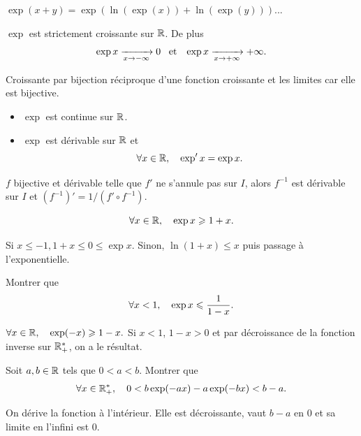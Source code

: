 \documentclass{magnoliaold}
\begin{document}
\begin{preuve}
$\exp(x+y)=\exp(\ln(\exp(x))+\ln(\exp(y)))$...
\end{preuve}

\begin{proposition}[utile=-3]
$\exp$ est strictement croissante sur $\mathbb{R}$. De plus
\[\exp x\xrightarrow[x\rightarrow -\infty]{} 0 \quad\!\text{et}\quad\! \exp x\xrightarrow[x\rightarrow +\infty]{} +\infty.\]
\end{proposition}

\begin{preuve}
Croissante par bijection réciproque d'une fonction croissante et les limites car elle est bijective.
\end{preuve}


\begin{proposition}[utile=-3]
\begin{itemize}
\item $\exp$ est continue sur $\mathbb{R}$.
\item $\exp$ est dérivable sur $\mathbb{R}$ et
  \[\forall x\in\mathbb{R} ,\quad \exp' x=\exp x.\]
\end{itemize}
\end{proposition}

\begin{preuve}
$f$ bijective et dérivable telle que $f'$ ne s'annule pas sur $I$, alors $f^{-1}$ est dérivable sur $I$ et $(f^{-1})'=1/(f'\circ f^{-1})$.
\end{preuve}

\begin{proposition}[utile=-3]
\[\forall x\in\mathbb{R} ,\quad \exp x \geqslant 1+x.\]
\end{proposition}
\begin{preuve}
Si $x\leq -1, 1+x\leq 0 \leq \exp x$. Sinon, $\ln(1+x)\leq  x$ puis passage à l'exponentielle.
\end{preuve}

\begin{exos}
\exemple Montrer que
  \[\forall x<1 ,\quad \exp x\leqslant\frac{1}{1-x}.\]
  \begin{sol}
  $\forall x\in\mathbb{R} ,\quad \exp (-x) \geqslant 1-x.$ Si $x<1$, $1-x>0$ et par décroissance de la fonction inverse sur $\mathbb{R}_+^*$, on a le résultat.
  \end{sol}
\exemple Soit $a,b\in\mathbb{R}$ tels que $0<a<b$. Montrer que
  \[\forall x\in\mathbb{R}_+^* ,\quad 0<b\exp(-ax)-a\exp(-bx)<b-a.\]
  \begin{sol}
  On dérive la fonction à l'intérieur. Elle est décroissante, vaut $b-a$ en $0$ et sa limite en l'infini est $0$.
  \end{sol}
\end{exos}
\end{document}
